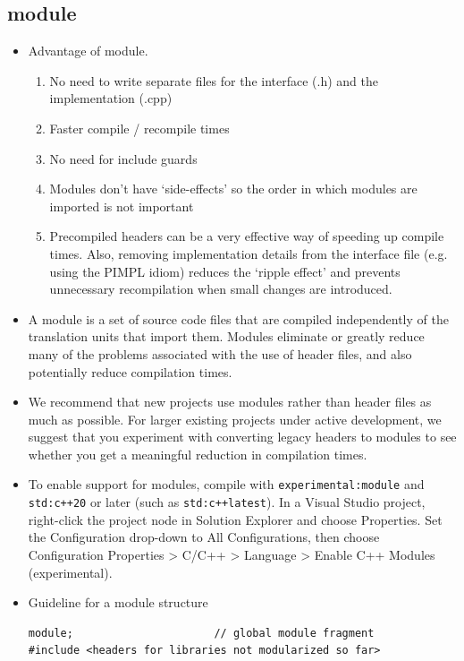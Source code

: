 \documentclass[a4paper,11pt,twoside]{book}
\begin{document}
\subsection{module}
\begin{itemize}
	
	\item Advantage of module.
	\begin{enumerate}
		\item No need to write separate files for the interface (.h) and the implementation (.cpp)
		\item Faster compile / recompile times
		\item No need for include guards	
		\item Modules don’t have ‘side-effects’ so the order in which modules are imported is not important
		\item Precompiled headers can be a very effective way of speeding up compile times. Also, removing implementation details from the interface file (e.g. using the PIMPL idiom) reduces the ‘ripple effect’ and prevents unnecessary recompilation when small changes are introduced.
	\end{enumerate}

	
	\item A module is a set of source code files that are compiled independently of the translation units that import them. Modules eliminate or greatly reduce many of the problems associated with the use of header files, and also potentially reduce compilation times. 
	
	\item We recommend that new projects use modules rather than header files as much as possible. For larger existing projects under active development, we suggest that you experiment with converting legacy headers to modules to see whether you get a meaningful reduction in compilation times.
	
	\item To enable support for modules, compile with \texttt{experimental:module} and \texttt{std:c++20} or later (such as \texttt{std:c++latest}). In a Visual Studio project, right-click the project node in Solution Explorer and choose Properties. Set the Configuration drop-down to All Configurations, then choose Configuration Properties > C/C++ > Language > Enable C++ Modules (experimental).
	
	\item Guideline for a module structure
	
\begin{lstlisting}
module;                      // global module fragment
#include <headers for libraries not modularized so far>


\end{lstlisting}
\end{itemize}
\end{document}
